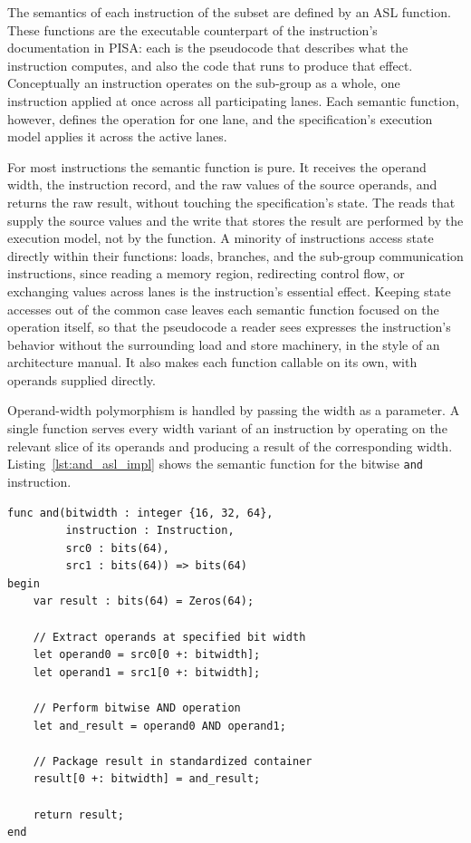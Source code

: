The semantics of each instruction of the subset are defined by an ASL
function. These functions are the executable counterpart of the
instruction's documentation in PISA: each
is the pseudocode that describes what the instruction computes, and
also the code that runs to produce that
effect. Conceptually an instruction operates on the sub-group as a whole,
one instruction applied at once across all participating lanes. Each semantic
function, however, defines the operation for one lane, and
the specification's execution model applies it across the active lanes.

For most instructions the semantic function is pure. It receives the
operand width, the instruction record, and the raw values of the source
operands, and returns the raw result, without touching the
specification's state. The reads that supply the source values and the
write that stores the result are performed by the execution model, not by
the function. A minority of instructions access state directly within
their functions: loads, branches, and the sub-group
communication instructions, since reading a memory region,
redirecting control flow, or exchanging values across lanes is the
instruction's essential effect. Keeping state accesses out of the common
case leaves each semantic function focused on the operation itself, so
that the pseudocode a reader sees expresses the instruction's behavior
without the surrounding load and store machinery, in the style of an
architecture manual. It also makes each function callable on its own,
with operands supplied directly.

Operand-width polymorphism is handled by passing the width as a
parameter. A single function serves every width variant of an instruction
by operating on the relevant slice of its operands and producing a result
of the corresponding width. Listing~\ref{lst:and_asl_impl} shows the
semantic function for the bitwise \texttt{and} instruction.

\begin{lstlisting}[caption={The semantic function of the bitwise \texttt{and} instruction. Annotated.}, label={lst:and_asl_impl}]
func and(bitwidth : integer {16, 32, 64},
         instruction : Instruction,
         src0 : bits(64),
         src1 : bits(64)) => bits(64)
begin
    var result : bits(64) = Zeros(64);

    // Extract operands at specified bit width
    let operand0 = src0[0 +: bitwidth];
    let operand1 = src1[0 +: bitwidth];

    // Perform bitwise AND operation
    let and_result = operand0 AND operand1;

    // Package result in standardized container
    result[0 +: bitwidth] = and_result;

    return result;
end
\end{lstlisting}

